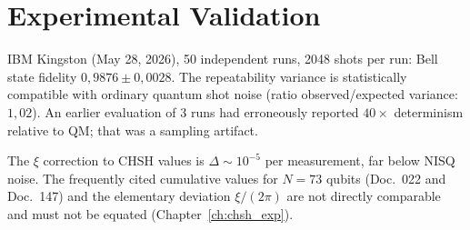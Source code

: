 \section{Experimental Validation}

IBM Kingston (May 28, 2026), 50 independent runs, 2048 shots per run:
Bell state fidelity $0{,}9876\pm0{,}0028$. The repeatability variance
is statistically compatible with ordinary quantum shot noise (ratio
observed/expected variance: $1{,}02$). An earlier evaluation of 3
runs had erroneously reported $40\times$ determinism relative to QM; that was a sampling artifact.

The $\xi$ correction to CHSH values is $\Delta\sim10^{-5}$ per
measurement, far below NISQ noise. The frequently cited cumulative
values for $N = 73$ qubits (Doc.~022 and Doc.~147) and the elementary
deviation $\xi/(2\pi)$ are not directly comparable and must not be
equated (Chapter~\ref{ch:chsh_exp}).

